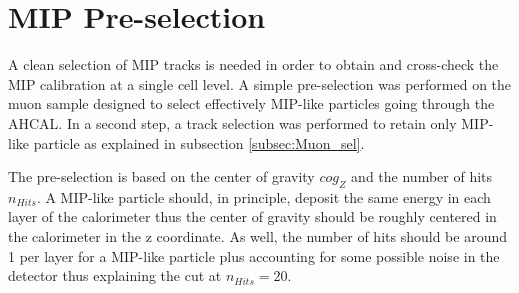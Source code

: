 \begin{table}[htb!]
	\centering
	\caption{List of runs taken at SPS in July 2015.}
	\label{table:dataruns}
\end{table}

\section{MIP Pre-selection}
\label{subsec:Muon_presel}

A clean selection of MIP tracks is needed in order to obtain and cross-check the MIP calibration at a single cell level. A simple pre-selection was performed on the muon sample designed to select effectively MIP-like particles going through the AHCAL. In a second step, a track selection was performed to retain only MIP-like particle as explained in subsection \ref{subsec:Muon_sel}.

The pre-selection is based on the center of gravity $cog_Z$ and the number of hits $n_{Hits}$. A MIP-like particle should, in principle, deposit the same energy in each layer of the calorimeter thus the center of gravity should be roughly centered in the calorimeter in the z coordinate. As well, the number of hits should be around 1 per layer for a MIP-like particle plus accounting for some possible noise in the detector thus explaining the cut at $n_{Hits} = 20$.

